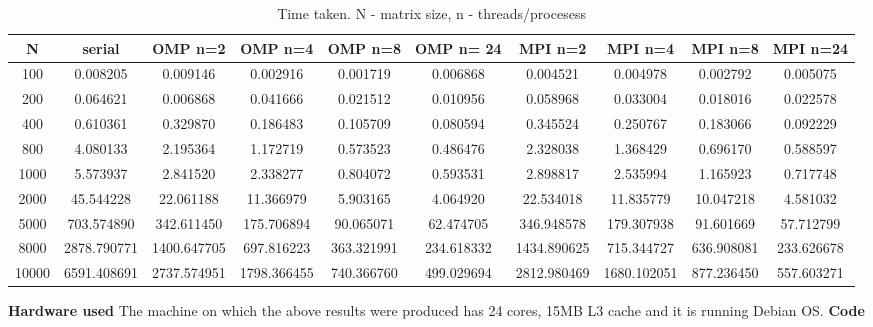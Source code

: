 \documentclass{article}
\begin{document}
\begin{table}[h]
	\caption{Time taken. N - matrix size, n - threads/procesess}
	\centering
	\begin{tabular}{| S[round-precision=3] | S[round-precision=3] | S[round-precision=3] | S[round-precision=3] | S[round-precision=3] | S[round-precision=3] | S[round-precision=3] | S[round-precision=3] | S[round-precision=3] | S[round-precision=3] |}
			\hline
			{N}&{serial} & {OMP n=2}& {OMP n=4}& {OMP n=8}& {OMP n= 24} & {MPI n=2}& {MPI n=4}& {MPI n=8}& {MPI n=24} \\ \hline
			{100}&0.008205&0.009146&0.002916&0.001719
			&0.006868 & 0.004521 & 0.004978 &0.002792&0.005075\\ \hline

			{200}&0.064621&0.006868&0.041666&	0.021512&0.010956
			&0.058968&0.033004&0.018016&0.022578\\ \hline

			{400} &0.610361&0.329870&0.186483&0.105709&0.080594 
			&0.345524&0.250767&0.183066&0.092229\\ \hline

			{800}&4.080133&2.195364&1.172719&0.573523&0.486476
			&2.328038&1.368429&0.696170&0.588597\\ \hline

			{1000}&5.573937&2.841520&2.338277&0.804072&0.593531
			&2.898817&2.535994&1.165923&0.717748\\ \hline

			{2000}&45.544228&22.061188&11.366979&5.903165&4.064920
			&22.534018&11.835779&10.047218&4.581032\\ \hline

			{5000}&703.574890&342.611450&175.706894&90.065071&62.474705
			&346.948578&179.307938&91.601669&57.712799\\ \hline

			{8000}&2878.790771&1400.647705&697.816223&363.321991 
			&234.618332&1434.890625&715.344727&636.908081
			&233.626678 \\ \hline

			{10000}&6591.408691&2737.574951&1798.366455&740.366760 
			&499.029694&2812.980469&1680.102051&877.236450&557.603271\\ 
			\hline
		\end{tabular}


\end{table}

\textbf{Hardware used}
The machine on which the above results were produced has 24 cores, 15MB L3 cache and it is running Debian OS.
\newpage
\textbf{Code}

\end{document}
